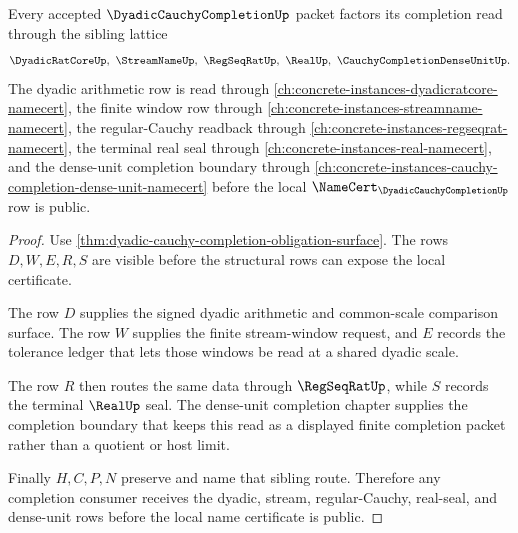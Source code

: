 \begin{theorem}
\label{thm:dyadic-cauchy-completion-sibling-bridge}
Every accepted $\DyadicCauchyCompletionUp$ packet factors its completion read through the sibling lattice
$$
\DyadicRatCoreUp,\ \StreamNameUp,\ \RegSeqRatUp,\ \RealUp,\ \CauchyCompletionDenseUnitUp .
$$
The dyadic arithmetic row is read through \autoref{ch:concrete-instances-dyadicratcore-namecert}, the finite window row through \autoref{ch:concrete-instances-streamname-namecert}, the regular-Cauchy readback through \autoref{ch:concrete-instances-regseqrat-namecert}, the terminal real seal through \autoref{ch:concrete-instances-real-namecert}, and the dense-unit completion boundary through \autoref{ch:concrete-instances-cauchy-completion-dense-unit-namecert} before the local $\NameCert_{\DyadicCauchyCompletionUp}$ row is public.
\end{theorem}
\begin{proof}
Use \autoref{thm:dyadic-cauchy-completion-obligation-surface}. The rows $D,W,E,R,S$ are visible before the structural rows can expose the local certificate.

The row $D$ supplies the signed dyadic arithmetic and common-scale comparison surface. The row $W$ supplies the finite stream-window request, and $E$ records the tolerance ledger that lets those windows be read at a shared dyadic scale.

The row $R$ then routes the same data through $\RegSeqRatUp$, while $S$ records the terminal $\RealUp$ seal. The dense-unit completion chapter supplies the completion boundary that keeps this read as a displayed finite completion packet rather than a quotient or host limit.

Finally $H,C,P,N$ preserve and name that sibling route. Therefore any completion consumer receives the dyadic, stream, regular-Cauchy, real-seal, and dense-unit rows before the local name certificate is public.
\end{proof}


